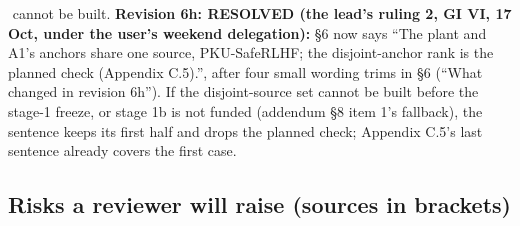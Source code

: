 \documentclass{article}
\theoremstyle{plain}
\theoremstyle{definition}
\theoremstyle{remark}
\begin{document}
\begin{enumerate}
$$        cannot be built. \textbf{Revision 6h: RESOLVED (the lead's ruling 2, GI
        VI, 17 Oct, under the user's weekend delegation):} \S{}6 now says ``The
        plant and A1's anchors share one source, PKU-SafeRLHF; the
        disjoint-anchor rank is the planned check (Appendix C.5).'', after four
        small wording trims in \S{}6 (``What changed in revision 6h''). If the
        disjoint-source set cannot be built before the stage-1 freeze, or stage
        1b is not funded (addendum \S{}8 item 1's fallback), the sentence keeps
        its first half and drops the planned check; Appendix C.5's last sentence
        already covers the first case.
\end{enumerate}

\subsection{Risks a reviewer will raise (sources in brackets)}
\end{document}

